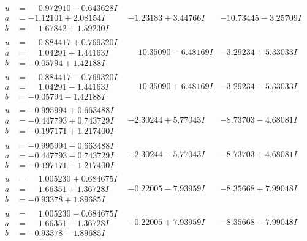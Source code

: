 \documentclass[1p]{elsarticle_modified}
\theoremstyle{definition}
\begin{document}
$$\begin{array}{c|c|c}
\begin{aligned}
u &= \phantom{-}0.972910 - 0.643628 I \\
a &= -1.12101 + 2.08154 I \\
b &= \phantom{-}1.67842 + 1.59230 I\end{aligned}
 & -1.23183 + 3.44766 I & -10.73445 - 3.25709 I \\ \hline\begin{aligned}
u &= \phantom{-}0.884417 + 0.769320 I \\
a &= \phantom{-}1.04291 + 1.44163 I \\
b &= -0.05794 + 1.42188 I\end{aligned}
 & \phantom{-}10.35090 - 6.48169 I & -3.29234 + 5.33033 I \\ \hline\begin{aligned}
u &= \phantom{-}0.884417 - 0.769320 I \\
a &= \phantom{-}1.04291 - 1.44163 I \\
b &= -0.05794 - 1.42188 I\end{aligned}
 & \phantom{-}10.35090 + 6.48169 I & -3.29234 - 5.33033 I \\ \hline\begin{aligned}
u &= -0.995994 + 0.663488 I \\
a &= -0.447793 + 0.743729 I \\
b &= -0.197171 + 1.217400 I\end{aligned}
 & -2.30244 + 5.77043 I & -8.73703 - 4.68081 I \\ \hline\begin{aligned}
u &= -0.995994 - 0.663488 I \\
a &= -0.447793 - 0.743729 I \\
b &= -0.197171 - 1.217400 I\end{aligned}
 & -2.30244 - 5.77043 I & -8.73703 + 4.68081 I \\ \hline\begin{aligned}
u &= \phantom{-}1.005230 + 0.684675 I \\
a &= \phantom{-}1.66351 + 1.36728 I \\
b &= -0.93378 + 1.89685 I\end{aligned}
 & -0.22005 - 7.93959 I & -8.35668 + 7.99048 I \\ \hline\begin{aligned}
u &= \phantom{-}1.005230 - 0.684675 I \\
a &= \phantom{-}1.66351 - 1.36728 I \\
b &= -0.93378 - 1.89685 I\end{aligned}
 & -0.22005 + 7.93959 I & -8.35668 - 7.99048 I \\ \hline\begin{aligned}

\end{aligned}
\end{array}$$
\end{document}
